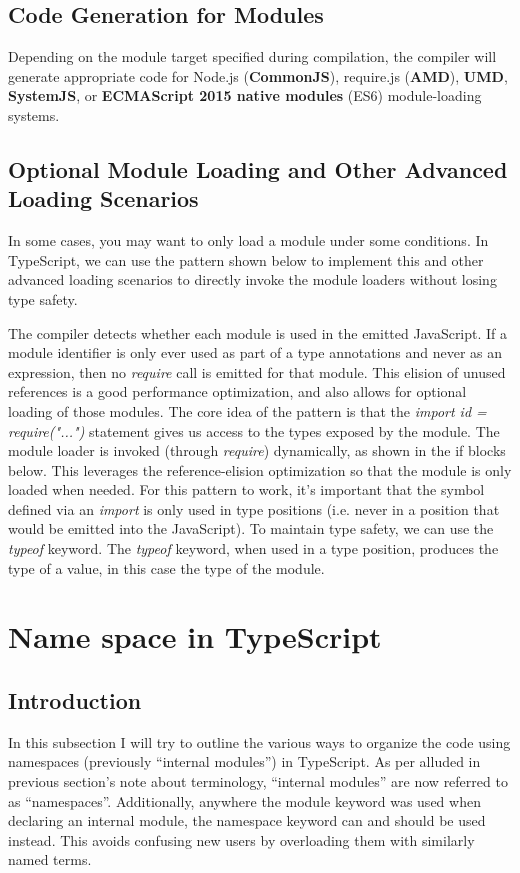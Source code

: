 \documentclass[a4paper]{report}
\begin{document}
\subsection{Code Generation for Modules}
Depending on the module target specified during compilation, the compiler will generate appropriate code for Node.js (\textbf{CommonJS}), require.js (\textbf{AMD}), \textbf{UMD}, \textbf{SystemJS}, or \textbf{ECMAScript 2015 native modules} (ES6) module-loading systems. 

\subsection{Optional Module Loading and Other Advanced Loading Scenarios}
In some cases, you may want to only load a module under some conditions. In TypeScript, we can use the pattern shown below to implement this and other advanced loading scenarios to directly invoke the module loaders without losing type safety.
\par
The compiler detects whether each module is used in the emitted JavaScript. If a module identifier is only ever used as part of a type annotations and never as an expression, then no \emph{require} call is emitted for that module. This elision of unused references is a good performance optimization, and also allows for optional loading of those modules.
The core idea of the pattern is that the \emph{import id = require("...")} statement gives us access to the types exposed by the module. The module loader is invoked (through \emph{require}) dynamically, as shown in the if blocks below. This leverages the reference-elision optimization so that the module is only loaded when needed. For this pattern to work, it’s important that the symbol defined via an \emph{import} is only used in type positions (i.e. never in a position that would be emitted into the JavaScript).
To maintain type safety, we can use the \emph{typeof} keyword. The \emph{typeof} keyword, when used in a type position, produces the type of a value, in this case the type of the module.

\section{Name space in TypeScript}
\subsection{Introduction}
In this subsection I will try to outline the various ways to organize the code using namespaces (previously “internal modules”) in TypeScript. As per alluded in previous section's note about terminology, ``internal modules'' are now referred to as “namespaces”. Additionally, anywhere the module keyword was used when declaring an internal module, the namespace keyword can and should be used instead. This avoids confusing new users by overloading them with similarly named terms.
\end{document}
